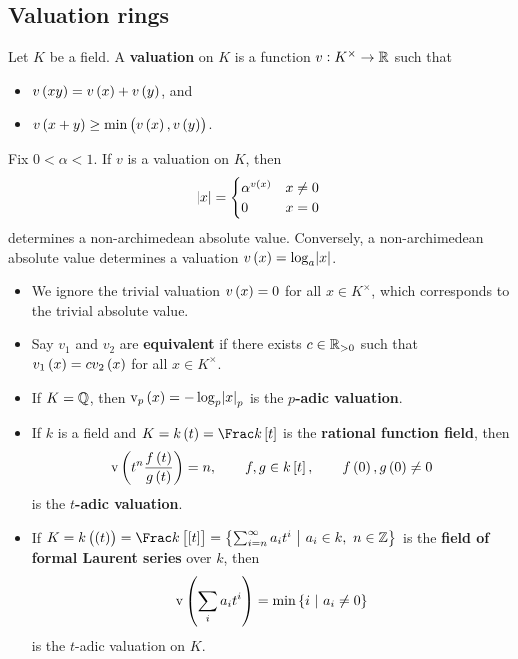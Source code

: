\subsection{Valuation rings}

\begin{definition}
Let $ K $ be a field. A \textbf{valuation} on $ K $ is a function $ v : K^\times \to \mathbb{R} $ such that
\begin{itemize}
\item $ v\br{xy} = v\br{x} + v\br{y} $, and
\item $ v\br{x + y} \ge \min\br{v\br{x}, v\br{y}} $.
\end{itemize}
\end{definition}

Fix $ 0 < \alpha < 1 $. If $ v $ is a valuation on $ K $, then
$$ \abs{x} =
\begin{cases}
\alpha^{v\br{x}} & x \ne 0 \\
0 & x = 0
\end{cases}
$$
determines a non-archimedean absolute value. Conversely, a non-archimedean absolute value determines a valuation $ v\br{x} = \log_a \abs{x} $.

\begin{remark*}
\hfill
\begin{itemize}
\item We ignore the trivial valuation $ v\br{x} = 0 $ for all $ x \in K^\times $, which corresponds to the trivial absolute value.
\item Say $ v_1 $ and $ v_2 $ are \textbf{equivalent} if there exists $ c \in \mathbb{R}_{> 0} $ such that $ v_1\br{x} = cv_2\br{x} $ for all $ x \in K^\times $.
\end{itemize}
\end{remark*}

\pagebreak

\begin{example*}
\hfill
\begin{itemize}
\item If $ K = \mathbb{Q} $, then $ \v_p\br{x} = -\log_p \abs{x}_p $ is the \textbf{$ p $-adic valuation}.
\item If $ k $ is a field and $ K = k\br{t} = \Frac k\sbr{t} $ is the \textbf{rational function field}, then
$$ \v\br{t^n\dfrac{f\br{t}}{g\br{t}}} = n, \qquad f, g \in k\sbr{t}, \qquad f\br{0}, g\br{0} \ne 0 $$
is the \textbf{$ t $-adic valuation}.
\item If $ K = k\br{\br{t}} = \Frac k\sbr{\sbr{t}} = \cbr{\sum_{i = n}^\infty a_it^i \st a_i \in k, \ n \in \ZZ} $ is the \textbf{field of formal Laurent series} over $ k $, then
$$ \v\br{\sum_i a_it^i} = \min \cbr{i \st a_i \ne 0} $$
is the $ t $-adic valuation on $ K $.
\end{itemize}
\end{example*}

